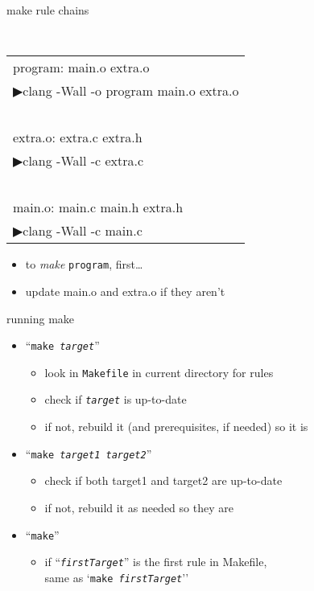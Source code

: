 \begin{frame}{make rule chains}

{\tt
\begin{tabular}{l}
program: main.o extra.o \\
▶\hspace{3cm}clang -Wall -o program main.o extra.o \\
~ \\
extra.o: extra.c extra.h \\
▶\hspace{3cm}clang -Wall -c extra.c \\
~ \\
main.o: main.c main.h extra.h \\
▶\hspace{3cm}clang -Wall -c main.c \\
\end{tabular}
}
\begin{itemize}
\item to \textit{make} \texttt{program}, first\ldots
\item update main.o and extra.o if they aren't
\end{itemize}
\end{frame}

\begin{frame}{running make}
\begin{itemize}
    \item ``\texttt{make \textit{target}}''
        \begin{itemize}
        \item look in \texttt{Makefile} in current directory for rules
        \item check if \texttt{\textit{target}} is up-to-date
        \item if not, rebuild it (and prerequisites, if needed) so it is
        \end{itemize}
    \item ``\texttt{make \textit{target1} \textit{target2}}''
        \begin{itemize}
        \item check if both target1 and target2 are up-to-date
        \item if not, rebuild it as needed so they are
        \end{itemize}
    \item ``\texttt{make}''
        \begin{itemize}
        \item if ``\texttt{\textit{firstTarget}}'' is the first rule in Makefile,\\
            same as `\texttt{make \textit{firstTarget}}''
        \end{itemize}
\end{itemize}
\end{frame}
